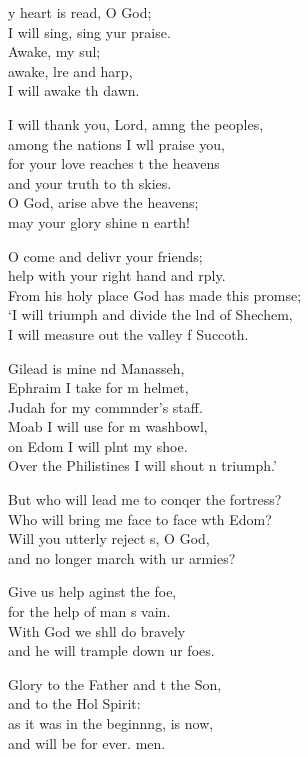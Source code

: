 \settowidth{\versewidth}{From his holy place God has made this promise; +}
\begin{psalmverse}%
  \begin{patverse}
y heart is read, O God;\Med\\
I will sing, sing yur praise.\\
Awake, my sul;\Flex\\
awake, lre and harp,\Med\\
I will awake th dawn.

I will thank you, Lord, amng the peoples,\Med\\
among the nations I w\pointup{\i}ll praise you,\\
for your love reaches t the heavens\Med\\
and your truth to th skies.\\
O God, arise abve the heavens;\Med\\
may your glory shine n earth!

O come and delivr your friends;\Med\\
help with your right hand and rply.\\
From his holy place God has made this prom\pointup{\i}se;\Flex\\
‘I will triumph and divide the lnd of Shechem,\\
I will measure out the valley f Succoth.

Gilead is mine nd Manasseh,\Med\\
Ephraim I take for m helmet,\\
Judah for my commnder’s staff.\Med\\
Moab I will use for m washbowl,\\
on Edom I will plnt my shoe.\Med\\
Over the Philistines I will shout \pointup{\i}n triumph.’

But who will lead me to conqer the fortress?\Med\\
Who will bring me face to face w\pointup{\i}th Edom?\\
Will you utterly reject s, O God,\Med\\
and no longer march with ur armies?

Give us help aginst the foe,\Med\\
for the help of man \pointup{\i}s vain.\\
With God we shll do bravely\Med\\
and he will trample down ur foes.

Glory to the Father and t the Son,\Med\\
and to the Hol Spirit:\\
as it was in the beginn\pointup{\i}ng, is now,\Med\\
and will be for ever. men.
  \end{patverse}
  \end{psalmverse}
